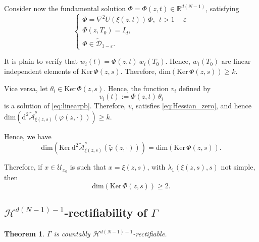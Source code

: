 \documentclass[a4paper,10pt]{amsart}
\newcommand{\ud}{\mathrm{d}}
\theoremstyle{plain}
\newtheorem{thm}{Theorem}
\theoremstyle{definition}
\numberwithin{equation}{section}
\numberwithin{thm}{section}
\begin{document}
Consider now the fundamental solution $\Phi=\Phi(z,t) \in \mathbb R^{d(N-1)}$, satisfying
\begin{equation}\label{eq:system_Phi}
\begin{cases}
\ddot{\Phi} = \nabla^2U(\xi(z,t))\,\Phi, \ \  t > 1-\varepsilon
\\
\Phi(z,T_0) = I_d,
\\
\Phi \in \tilde{\mathcal D}_{1-\varepsilon}.
\end{cases}
\end{equation}

It is plain to verify that $w_i(t)=\Phi(z,t)\,w_i(T_0)$. Hence, $w_i(T_0)$ are linear independent elements of $\mathrm{Ker}\,\Phi(z,s)$. Therefore, $\mathrm{dim}(\mathrm{Ker}\,\Phi(z,s))\ge k$.

Vice versa, let $\theta_i \in \mathrm{Ker}\,\Phi(z,s)$. Hence, the function $v_i$ defined by
\[
v_i(t):=\Phi(z,t)\,\theta_i
\]
is a solution of \eqref{eq:linearpb}. Therefore, $v_i$ satisfies \eqref{eq:Hessian_zero}, and hence $\mathrm{dim}(\ud^2 \tilde{\mathcal{A}}_{\xi(z,s)}^s(\varphi(z,\cdot))) \ge k$. 

Hence, we have
\[
\mathrm{dim}(\mathrm{Ker}\,\ud^2 \tilde{\mathcal{A}}_{\xi(z,s)}^s(\tilde\varphi(z,\cdot))) = \mathrm{dim}(\mathrm{Ker}\,\Phi(z,s)).
\]

Therefore, if $x \in \mathcal U_{x_0}$ is such that $x=\xi(z,s)$, with $\lambda_1(\xi(z,s),s)$ not simple, then 
\[
\mathrm{dim}(\mathrm{Ker}\,\Phi(z,s)) \ge 2.
\]


\subsection{$\mathcal{H}^{d(N-1)-1}$-rectifiability of $\Gamma$}

\begin{thm}
    $\Gamma$ is countably $\mathcal{H}^{d(N-1)-1}$-rectifiable.
\end{thm}
\end{document}
